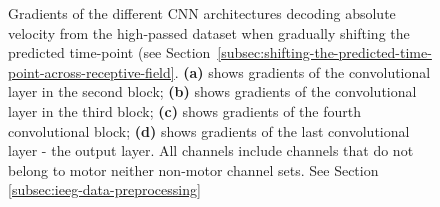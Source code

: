 \begin{figure}[!htpb]
\caption[]{Gradients of the different CNN architectures decoding absolute velocity from the high-passed dataset when gradually shifting the predicted time-point (see Section~\ref{subsec:shifting-the-predicted-time-point-across-receptive-field}. \textbf{(a)} shows gradients of the convolutional layer in the second block; \textbf{(b)} shows gradients of the convolutional layer in the third block; \textbf{(c)} shows gradients of the fourth convolutional block; \textbf{(d)} shows gradients of the last convolutional layer - the output layer. All channels include channels that do not belong to motor neither non-motor channel sets. See Section \ref{subsec:ieeg-data-preprocessing}}
\label{fig:absVel-hp-shifting-grads}
\end{figure}
